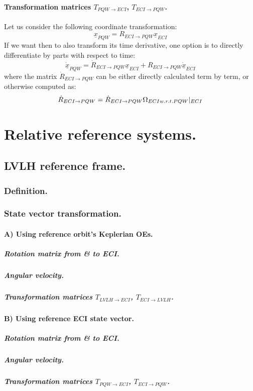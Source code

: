 			\paragraph{Transformation matrices $T_{PQW\rightarrow ECI}$, $T_{ECI\rightarrow PQW}$. \\}
			\indent Let us consider the following coordinate transformation:
			\[
			\underline{x}_{PQW} = R_{ECI\rightarrow PQW} \underline{x}_{ECI}
			\]
			\indent If we want then to also transform its time derivative, one option is to directly differentiate by parts with respect to time:
			\[
			\underline{\dot{x}}_{PQW} = \dot{R}_{ECI\rightarrow PQW} \underline{x}_{ECI} + R_{ECI\rightarrow PQW} \underline{\dot{x}}_{ECI}
			\]
			\noindent where the matrix $\dot{R}_{ECI\rightarrow PQW}$ can be either directly calculated term by term, or otherwise computed as:
			\[
			\dot{R}_{ECI\rightarrow PQW} = \dot{R}_{ECI\rightarrow PQW} \Omega_{ECI w.r.t. PQW}\rvert_{ECI}
			\]
		
\section{Relative reference systems.}
%
	
	\subsection{LVLH reference frame.}
		\subsubsection{Definition.}
		\subsubsection{State vector transformation.}
		\paragraph{A) Using reference orbit's Keplerian OEs. \\}
			\subparagraph{Rotation matrix from \& to ECI. \\}
			\subparagraph{Angular velocity. \\}
			\subparagraph{Transformation matrices $T_{LVLH\rightarrow ECI}$, $T_{ECI\rightarrow LVLH}$. \\}
		\paragraph{B) Using reference ECI state vector. \\}
			\subparagraph{Rotation matrix from \& to ECI. \\}
			\subparagraph{Angular velocity. \\}
			\subparagraph{Transformation matrices $T_{PQW\rightarrow ECI}$, $T_{ECI\rightarrow PQW}$. \\}
		
